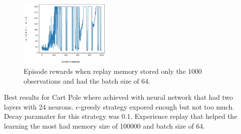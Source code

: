 \begin{figure}[H]
    \centering
    \includegraphics[width=0.4\textwidth]{images/experience_replay.png}
    \caption{
    Episode rewards when replay memory stored only the 1000 observations and had the batch size of 64.
    }
    \label{fig:experience_replay}
\end{figure}

Best results for Cart Pole where achieved with neural network that had two layers with 24 neurons. $\epsilon$-greedy strategy expored enough but not too much. Decay paramater for this strategy was 0.1. Experience replay that helped the learning the most had memory size of 100000 and batch size of 64.
